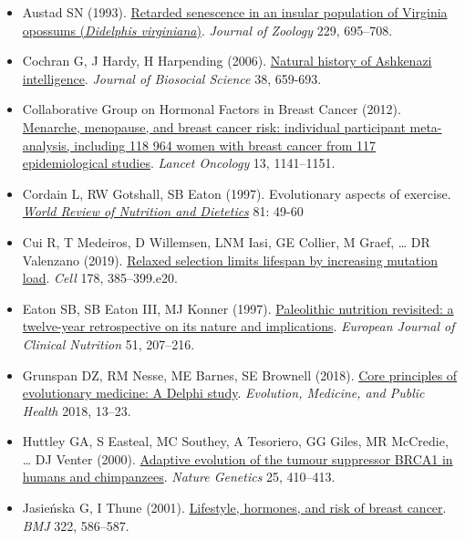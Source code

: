 \documentclass[
]{book}
\begin{document}
\begin{itemize}
\item
  Austad SN (1993). \href{https://zslpublications.onlinelibrary.wiley.com/doi/abs/10.1111/j.1469-7998.1993.tb02665.x}{Retarded senescence in an insular population of Virginia opossums (\emph{Didelphis virginiana})}. \emph{Journal of Zoology} 229, 695--708.
\item
  Cochran G, J Hardy, H Harpending (2006). \href{https://www.cambridge.org/core/journals/journal-of-biosocial-science/article/abs/natural-history-of-ashkenazi-intelligence/170E96F5581A9F39524DAC717886D945}{Natural history of Ashkenazi intelligence}. \emph{Journal of Biosocial Science} 38, 659-693.
\item
  Collaborative Group on Hormonal Factors in Breast Cancer (2012). \href{https://www.thelancet.com/journals/lanonc/article/PIIS1470-2045(12)70425-4/fulltext}{Menarche, menopause, and breast cancer risk: individual participant meta-analysis, including 118 964 women with breast cancer from 117 epidemiological studies}. \emph{Lancet Oncology} 13, 1141--1151.
\item
  Cordain L, RW Gotshall, SB Eaton (1997). Evolutionary aspects of exercise. \href{https://www.karger.com/Article/Abstract/59601}{\emph{World Review of Nutrition and Dietetics}} 81: 49-60
\item
  Cui R, T Medeiros, D Willemsen, LNM Iasi, GE Collier, M Graef, \ldots{} DR Valenzano (2019). \href{https://www.cell.com/cell/fulltext/S0092-8674(19)30632-4}{Relaxed selection limits lifespan by increasing mutation load}. \emph{Cell} 178, 385--399.e20.
\item
  Eaton SB, SB Eaton III, MJ Konner (1997). \href{https://www.nature.com/articles/1600389}{Paleolithic nutrition revisited: a twelve-year retrospective on its nature and implications}. \emph{European Journal of Clinical Nutrition} 51, 207--216.
\item
  Grunspan DZ, RM Nesse, ME Barnes, SE Brownell (2018). \href{https://academic.oup.com/emph/article/2018/1/13/4774983}{Core principles of evolutionary medicine: A Delphi study}. \emph{Evolution, Medicine, and Public Health} 2018, 13--23.
\item
  Huttley GA, S Easteal, MC Southey, A Tesoriero, GG Giles, MR McCredie, \ldots{} DJ Venter (2000). \href{https://www.nature.com/articles/ng0800_410}{Adaptive evolution of the tumour suppressor BRCA1 in humans and chimpanzees}. \emph{Nature Genetics} 25, 410--413.
\item
  Jasieńska G, I Thune (2001). \href{https://www.bmj.com/content/322/7286/586}{Lifestyle, hormones, and risk of breast cancer}. \emph{BMJ} 322, 586--587.

\end{itemize}
\end{document}

